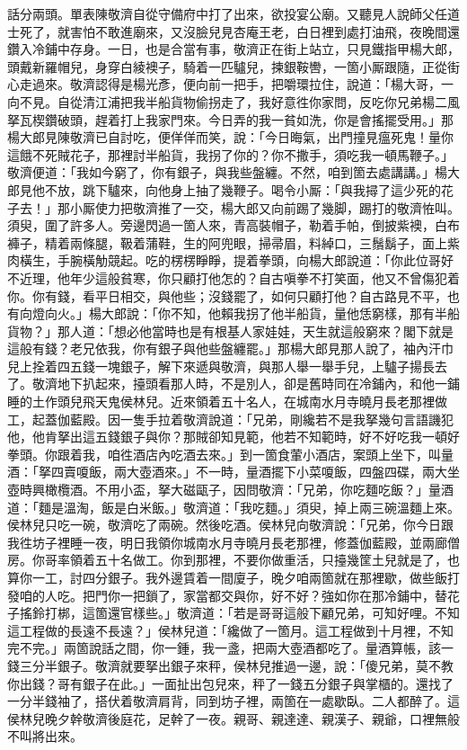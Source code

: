 話分兩頭。單表陳敬濟自從守備府中打了出來，欲投宴公廟。又聽見人說師父任道士死了，就害怕不敢進廟來，又沒臉兒見杏庵王老，白日裡到處打油飛，夜晚間還鑽入冷鋪中存身。一日，也是合當有事，敬濟正在街上站立，只見鐵指甲楊大郎，頭戴新羅帽兒，身穿白綾襖子，騎着一匹驢兒，揀銀鞍轡，一箇小厮跟隨，正從街心走過來。敬濟認得是楊光彥，便向前一把手，把嚼環拉住，說道：「楊大哥，一向不見。自從清江浦把我半船貨物偷拐走了，我好意徃你家問，反吃你兄弟楊二風拏瓦楔鑽破頭，趕着打上我家門來。今日弄的我一貧如洗，你是會搖擺受用。」那楊大郎見陳敬濟已自討吃，便佯佯而笑，說：「今日晦氣，出門撞見瘟死鬼！量你這餓不死賊花子，那裡討半船貨，我拐了你的？你不撒手，須吃我一頓馬鞭子。」敬濟便道：「我如今窮了，你有銀子，與我些盤纏。不然，咱到箇去處講講。」楊大郎見他不放，跳下驢來，向他身上抽了幾鞭子。喝令小厮：「與我撏了這少死的花子去！」那小厮使力把敬濟推了一交，楊大郎又向前踢了幾脚，踢打的敬濟恠叫。須臾，圍了許多人。旁邊閃過一箇人來，青高裝帽子，勒着手帕，倒披紫襖，白布褲子，精着兩條腿，靸着蒲鞋，生的阿兜眼，掃帚眉，料綽口，三鬚鬍子，面上紫肉橫生，手腕橫觔競起。吃的楞楞睜睜，提着拳頭，向楊大郎說道：「你此位哥好不近理，他年少這般貧寒，你只顧打他怎的？{}自古嗔拳不打笑面，他又不曾傷犯着你。你有錢，看平日相交，與他些；沒錢罷了，如何只顧打他？自古路見不平，也有向燈向火。」楊大郎說：「你不知，他賴我拐了他半船貨，量他恁窮樣，那有半船貨物？」那人道：「想必他當時也是有根基人家娃娃，天生就這般窮來？閣下就是這般有錢？老兄依我，你有銀子與他些盤纏罷。」那楊大郎見那人說了，袖內汗巾兒上拴着四五錢一塊銀子，解下來遞與敬濟，與那人舉一舉手兒，上驢子揚長去了。敬濟地下扒起來，擡頭看那人時，不是別人，卻是舊時同在冷鋪內，和他一鋪睡的土作頭兒飛天鬼侯林兒。近來領着五十名人，在城南水月寺曉月長老那裡做工，起蓋伽藍殿。因一隻手拉着敬濟說道：「兄弟，剛纔若不是我拏幾句言語譏犯他，他肯拏出這五錢銀子與你？那賊卻知見範，他若不知範時，好不好吃我一頓好拳頭。你跟着我，咱徃酒店內吃酒去來。」到一箇食葷小酒店，案頭上坐下，叫量酒：「拏四賣嗄飯，兩大壺酒來。」不一時，量酒擺下小菜嗄飯，四盤四碟，兩大坐壺時興橄欖酒。不用小盃，拏大磁甌子，因問敬濟：「兄弟，你吃麵吃飯？」量酒道：「麵是溫淘，飯是白米飯。」敬濟道：「我吃麵。」須臾，掉上兩三碗溫麵上來。侯林兒只吃一碗，敬濟吃了兩碗。然後吃酒。侯林兒向敬濟說：「兄弟，你今日跟我徃坊子裡睡一夜，{}明日我領你城南水月寺曉月長老那裡，修蓋伽藍殿，並兩廊僧房。你哥率領着五十名做工。你到那裡，不要你做重活，只擡幾筐土兒就是了，也算你一工，討四分銀子。我外邊賃着一間廈子，晚夕咱兩箇就在那裡歇，{}做些飯打發咱的人吃。把門你一把鎖了，家當都交與你，{}好不好？強如你在那冷鋪中，替花子搖鈴打梆，這箇還官樣些。」敬濟道：「若是哥哥這般下顧兄弟，可知好哩。不知這工程做的長遠不長遠？」侯林兒道：「纔做了一箇月。這工程做到十月裡，不知完不完。」兩箇說話之間，你一鍾，我一盞，把兩大壺酒都吃了。量酒算帳，該一錢三分半銀子。敬濟就要拏出銀子來秤，侯林兒推過一邊，說：「傻兄弟，莫不教你出錢？哥有銀子在此。」一面扯出包兒來，秤了一錢五分銀子與掌櫃的。還找了一分半錢袖了，搭伏着敬濟肩背，同到坊子裡，兩箇在一處歇臥。二人都醉了。這侯林兒晚夕幹敬濟後庭花，足幹了一夜。親哥、親達達、親漢子、親爺，口裡無般不叫將出來。

